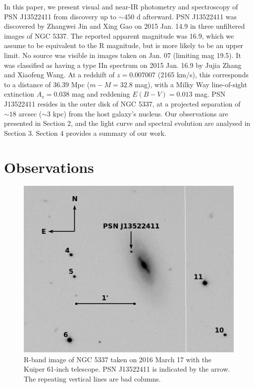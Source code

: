 \documentclass[a4paper,fleqn,usenatbib]{mnras}
\begin{document}
In this paper, we present visual and near-IR photometry and spectroscopy of PSN J13522411 from discovery up to $\sim450$ d afterward. PSN J13522411 was discovered by Zhangwei Jin and Xing Gao on 2015 Jan. 14.9 in three unfiltered images of NGC 5337. The reported apparent magnitude was 16.9, which we assume to be equivalent to the R magnitude, but is more likely to be an upper limit. No source was visible in images taken on Jan. 07 (limiting mag 19.5). It was classified as having a type IIn spectrum on 2015 Jan. 16.9 by Jujia Zhang and Xiaofeng Wang. At a redshift of $z = 0.007007$ (2165 km/s), this corresponds to a distance of 36.39 Mpc ($m - M = 32.8$ mag), with a Milky Way line-of-sight extinction $A_v = 0.038$ mag and reddening $E(B - V) = 0.013$ mag. PSN J13522411 resides in the outer disk of NGC 5337, at a projected separation of $\sim18$ arcsec ($\sim3$ kpc) from the host galaxy's nucleus. Our observations are presented in Section 2, and the light curve and spectral evolution are analysed in Section 3. Section 4 provides a summary of our work.

\section{Observations} \label{obs}

\begin{figure}
  \includegraphics[width=\linewidth]{graphics/Kuiper_R.jpeg}
  \caption{R-band image of NGC 5337 taken on 2016 March 17 with the Kuiper 61-inch telescope. PSN J13522411 is indicated by the arrow. The repeating vertical lines are bad columns.}
  \label{fig:kuiper}
\end{figure}
\end{document}
